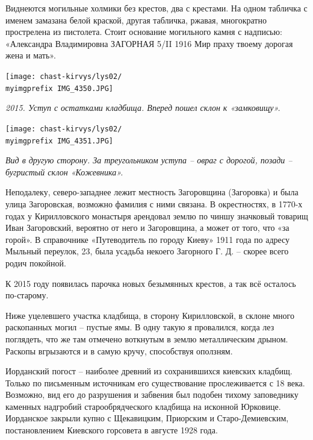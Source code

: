 Виднеются могильные холмики без крестов, два с крестами. На одном табличка с именем замазана белой краской, другая табличка, ржавая, многократно прострелена из пистолета. Стоит основание могильного камня с надписью: «Александра Владимировна ЗАГОРНАЯ 5/II 1916 Мир праху твоему дорогая жена и мать». 

\newpage

\begin{center}
\texttt{[image: chast-kirvys/lys02/\\myimgprefix IMG\_4350.JPG]}

\textit{2015. Уступ с остатками кладбища. Вперед пошел склон к «замковищу».}
\end{center}

\begin{center}
\texttt{[image: chast-kirvys/lys02/\\myimgprefix IMG\_4351.JPG]}

\textit{Вид в другую сторону. За треугольником уступа – овраг с дорогой, позади – бугристый склон «Кожевника».}
\end{center}

\newpage

Неподалеку, северо-западнее лежит местность Загоровщина (Загоровка) и была улица Загоровская, возможно фамилия с ними связана. В окрестностях, в 1770-х годах у Кирилловского монастыря арендовал землю по чиншу значковый товарищ Иван Загоровский, вероятно от него и Загоровщина, а может от того, что «за горой». В справочнике «Путеводитель по городу Киеву» 1911 года по адресу Мыльный переулок, 23, была усадьба некоего Загорного Г. Д. – скорее всего родич покойной.

К 2015 году появилась парочка новых безымянных крестов, а так всё осталось по-старому.

Ниже уцелевшего участка кладбища, в сторону Кирилловской, в склоне много раскопанных могил – пустые ямы. В одну такую я провалился, когда лез поглядеть, что же там отмечено воткнутым в землю металлическим дрыном. Раскопы вгрызаются и в самую кручу, способствуя оползням.

Иорданский погост – наиболее древний из сохранившихся киевских кладбищ. Только по письменным источникам его существование прослеживается с 18 века. Возможно, вид его до разрушения и забвения был подобен тихому заповеднику каменных надгробий старообрядческого кладбища на исконной Юрковице. Иорданское закрыли купно с Щекавицким, Приорским и Старо-Демиевским, постановлением Киевского горсовета в августе 1928 года.

